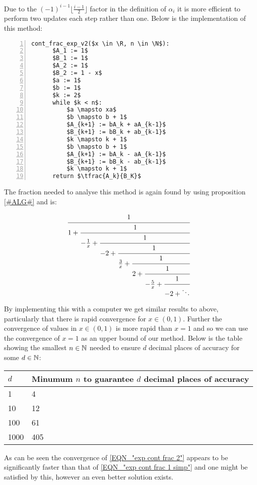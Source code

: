 Due to the \((-1)^{i-1}\lfloor\frac{i-1}{2}\rfloor\) factor in the definition of \(\alpha_i\) it is more efficient to perform two updates each step rather than one. Below is the implementation of this method:

\begin{lstlisting}[numbers=left,frame=single,mathescape,caption={Continued fraction for \(e^x\) version 2},label={PCD_"cont exp v2"}]
  cont_frac_exp_v2($x \in \R, n \in \N$):
      $A_1 := 1$
      $B_1 := 1$
      $A_2 := 1$
      $B_2 := 1 - x$
      $a := 1$
      $b := 1$
      $k := 2$
      while $k < n$:
          $a \mapsto xa$
          $b \mapsto b + 1$
          $A_{k+1} := bA_k + aA_{k-1}$
          $B_{k+1} := bB_k + ab_{k-1}$
          $k \mapsto k + 1$
          $b \mapsto b + 1$
          $A_{k+1} := bA_k - aA_{k-1}$
          $B_{k+1} := bB_k - ab_{k-1}$
          $k \mapsto k + 1$
      return $\tfrac{A_k}{B_K}$
\end{lstlisting}

The fraction needed to analyse this method is again found by using proposition \ref{#ALG#} and is:

\begin{displaymath}
	\cfrac{1}{1 +
	\cfrac{1}{-\frac{1}{x} +
	\cfrac{1}{-2 + 
	\cfrac{1}{\frac{3}{x} +
	\cfrac{1}{2 + 
	\cfrac{1}{-\frac{5}{x} +
	\cfrac{1}{-2 + \ddots} } } } } } }
\end{displaymath}

By implementing this with a computer we get similar results to above, particularly that there is rapid convergence for \(x \in (0, 1)\). Further the convergence of values in \(x \in (0,1)\) is more rapid than \(x = 1\) and so we can use the convergence of \(x = 1\) as an upper bound of our method. Below is the table showing the smallest \(n \in \mathbb{N}\) needed to ensure \(d\) decimal places of accuracy for some \(d \in \mathbb{N}\):

\begin{center}
\begin{tabular}{|l|l|}
\hline
\(d\) & Minumum \(n\) to guarantee \(d\) decimal places of accuracy\\\hline
1 & 4 \\\hline
10 & 12 \\\hline
100 & 61 \\\hline
1000 & 405 \\\hline
\end{tabular}
\end{center}

As can be seen the convergence of \ref{EQN_"exp cont frac 2"} appears to be significantly faster than that of \ref{EQN_"exp cont frac 1 simp"} and one might be satisfied by this, however an even better solution exists.\\

